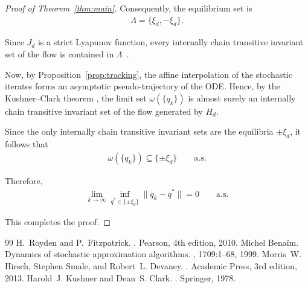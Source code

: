 \documentclass[10pt,a4paper]{amsart}
\begin{document}
\begin{proof}[Proof of Theorem~\ref{thm:main}]
Consequently, the equilibrium set is
\begin{align}
\Lambda = \{\xi_d, -\xi_d\}.
\end{align}

Since $J_d$ is a strict Lyapunov function, every internally chain transitive invariant set of the flow is contained in $\Lambda$~\cite{benaim1999dynamics}. 

Now, by Proposition~\ref{prop:tracking}, the affine interpolation of the stochastic iterates forms an asymptotic pseudo-trajectory of the ODE. Hence, by the Kushner–Clark theorem \cite{kushner1978, benaim1999dynamics}, the limit set $\omega(\{q_k\})$ is almost surely an internally chain transitive invariant set of the flow generated by $H_d$.

Since the only internally chain transitive invariant sets are the equilibria $\pm \xi_d$, it follows that
\begin{align}
\omega(\{q_k\})
\subseteq
\{\pm\xi_d\}
\qquad \text{a.s.}
\end{align}

Therefore,
\begin{align}
\lim_{k\to\infty}
\inf_{q^\ast\in\{\pm\xi_d\}}
\|q_k-q^\ast\|
=
0
\qquad \text{a.s.}
\end{align}

This completes the proof.
\end{proof}


\begin{thebibliography}{99}
 H.~Royden and P.~Fitzpatrick. . \newblock Pearson, 4th edition, 2010.
 Michel Bena{\"i}m. \newblock Dynamics of stochastic approximation algorithms. , 1709:1--68, 1999.
 Morris~W. Hirsch, Stephen Smale, and Robert~L. Devaney. . \newblock Academic Press, 3rd edition, 2013.
 Harold~J. Kushner and Dean~S. Clark. . \newblock Springer, 1978.
\end{thebibliography}
\end{document}
